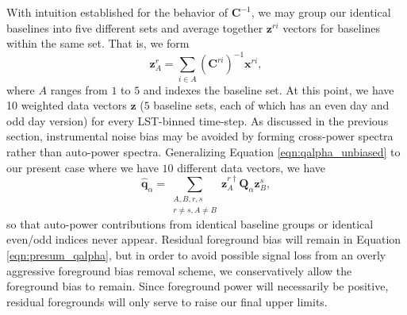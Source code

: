 \documentclass[twocolumn,numberedappendix]{emulateapj} \shorttitle{PSA64}
\newcommand{\qhat}{\hat{\mathbf{q}}}
\begin{document}
With intuition established for the behavior of $\mathbf{C}^{-1}$, we may group our identical
baselines into five different sets and average together $\mathbf{z}^{ri}$ vectors for baselines
within the same set. That is, we form
\begin{equation}\label{eqn:presum_oqe}
    \mathbf{z}^{r}_{A} = \sum_{i\in{A}} (\mathbf{C}^{ri})^{-1}\mathbf{x}^{ri},
\end{equation}
where $A$ ranges from $1$ to $5$ and indexes the baseline set. At this point,
we have 10 weighted data vectors $\mathbf{z}$ ($5$ baseline sets, each of which has
an even day and odd day version) for every LST-binned time-step. As discussed in the
previous section, instrumental noise bias may be avoided by forming cross-power spectra
rather than auto-power spectra. Generalizing Equation \eqref{eqn:qalpha_unbiased} to our
present case where we have $10$ different data vectors, we have
\begin{equation}\label{eqn:presum_qalpha}
    \qhat_{\alpha} = \sum_{\substack{A,B,r,s\\r\ne{s},A\ne{B}}}\mathbf{z}^{r\dagger}_{A}\mathbf{Q}_{\alpha}\mathbf{z}^{s}_{B},
\end{equation}
so that auto-power contributions from identical baseline groups or identical even/odd indices
never appear. Residual foreground bias will remain in Equation \eqref{eqn:presum_qalpha}, 
but in order to avoid possible signal loss from an overly aggressive foreground bias removal scheme, 
we conservatively allow the foreground bias to remain. Since foreground power will necessarily
be positive, residual foregrounds will only serve to raise our final upper limits.
\end{document}
